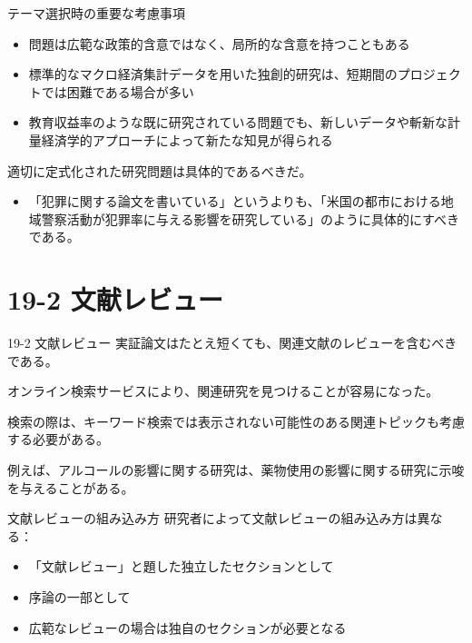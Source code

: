 \documentclass[
  ignorenonframetext,
]{beamer}
\providecommand{\tightlist}{%
  \setlength{\itemsep}{0pt}\setlength{\parskip}{0pt}}
\begin{document}
\begin{frame}{テーマ選択時の重要な考慮事項}
\label{ux30c6ux30fcux30deux9078ux629eux6642ux306eux91cdux8981ux306aux8003ux616eux4e8bux9805}
\begin{itemize}
\tightlist
\item
  問題は広範な政策的含意ではなく、局所的な含意を持つこともある
\item
  標準的なマクロ経済集計データを用いた独創的研究は、短期間のプロジェクトでは困難である場合が多い
\item
  教育収益率のような既に研究されている問題でも、新しいデータや斬新な計量経済学的アプローチによって新たな知見が得られる
\end{itemize}

適切に定式化された研究問題は具体的であるべきだ。

\begin{itemize}
\tightlist
\item
  「犯罪に関する論文を書いている」というよりも、「米国の都市における地域警察活動が犯罪率に与える影響を研究している」のように具体的にすべきである。
\end{itemize}
\end{frame}

\section{19-2 文献レビュー}\label{ux6587ux732eux30ecux30d3ux30e5ux30fc}

\begin{frame}{19-2 文献レビュー}
\label{ux6587ux732eux30ecux30d3ux30e5ux30fc-1}
実証論文はたとえ短くても、関連文献のレビューを含むべきである。

オンライン検索サービスにより、関連研究を見つけることが容易になった。

検索の際は、キーワード検索では表示されない可能性のある関連トピックも考慮する必要がある。

例えば、アルコールの影響に関する研究は、薬物使用の影響に関する研究に示唆を与えることがある。
\end{frame}

\begin{frame}{文献レビューの組み込み方}
\label{ux6587ux732eux30ecux30d3ux30e5ux30fcux306eux7d44ux307fux8fbcux307fux65b9}
研究者によって文献レビューの組み込み方は異なる：

\begin{itemize}
\tightlist
\item
  「文献レビュー」と題した独立したセクションとして
\item
  序論の一部として
\item
  広範なレビューの場合は独自のセクションが必要となる
\end{itemize}
\end{frame}
\end{document}
